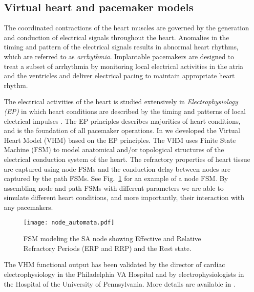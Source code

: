 \subsection{Virtual heart and pacemaker models}
\label{heartmodel}

The coordinated contractions of the heart muscles are governed by the generation and conduction of electrical signals throughout the heart. Anomalies in the timing and pattern of the electrical signals results in abnormal heart rhythms, which are referred to as \emph{arrhythmia}. Implantable pacemakers are designed to treat a subset of arrhythmia by monitoring local electrical activities in the atria and the ventricles and deliver electrical pacing to maintain appropriate heart rhythm. %

The electrical activities of the heart is studied extensively in \emph{Electrophysiology (EP)} in which heart conditions are described by the timing and patterns of local electrical impulses \cite{josephson}. The EP principles describes majorities of heart conditions, and is the foundation of all pacemaker operations. In \cite{VHM_proc} we developed the Virtual Heart Model (VHM) based on the EP principles. The VHM uses Finite State Machine (FSM) to model anatomical and/or topological structures of the electrical conduction system of the heart. The refractory properties of heart tissue are captured using node FSMs and the conduction delay between nodes are captured by the path FSMs. See Fig.~\ref{fig:FSMSA} for an example of a node FSM. By assembling node and path FSMs with different parameters we are able to simulate different heart conditions, and more importantly, their interaction with any pacemakers.
\begin{figure}[t]
\centering
\texttt{[image: node\_automata.pdf]}
\caption{FSM modeling the SA node showing Effective and Relative Refractory Periods (ERP and RRP) and the Rest state.}
\label{fig:FSMSA}
\end{figure}
The VHM functional output has been validated by the director of cardiac electrophysiology in the Philadelphia VA Hospital and by electrophysiologists in the Hospital of the University of Pennsylvania. 
More details are available in \cite{VHM_proc}.

